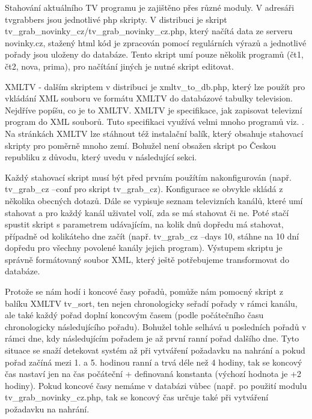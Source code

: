 \vspace{10pt}

Stahování aktuálního TV programu je zajištěno přes různé moduly. V adresáři tvgrabbers jsou jednotlivé php skripty. V distribuci je skript tv\_grab\_novinky\_cz/tv\_grab\_novinky\_cz.php, který načítá data ze serveru novinky.cz, stažený html kód je zpracován pomocí regulárních výrazů a jednotlivé pořady jsou uloženy do databáze. Tento skript umí pouze několik programů (čt1, čt2, nova, prima), pro načítání jiných je nutné skript editovat.

\vspace{10pt}

XMLTV - dalším skriptem v distribuci je xmltv\_to\_db.php, který lze použít pro vkládání XML souboru ve formátu XMLTV do databázové tabulky television. Nejdříve popíšu, co je to XMLTV. XMLTV je specifikace, jak zapisovat televizní program do XML souborů. Tuto specifikaci využívá velmi mnoho programů viz. \cite{xmltvURL}. Na stránkách XMLTV lze stáhnout též instalační balík, který obsahuje stahovací skripty pro poměrně mnoho zemí. Bohužel není obsažen skript po Českou republiku z důvodu, který uvedu v následující sekci.

\vspace{10pt}

Každý stahovací skript musí být před prvním použítím nakonfigurován (např. tv\_grab\_cz --conf pro skript tv\_grab\_cz). Konfigurace se obvykle skládá z několika obecných dotazů. Dále se vypisuje seznam televizních kanálů, které umí stahovat a pro každý kanál uživatel volí, zda se má stahovat či ne. Poté stačí spustit skript s parametrem udávajícím, na kolik dnů dopředu má stahovat, případně od kolikáteho dne začít (např. tv\_grab\_cz --days 10, stáhne na 10 dní dopředu pro všechny povolené kanály jejich program). Výstupem skriptu je správně formátovaný soubor XML, který ještě potřebujeme transformovat do databáze.

\vspace{10pt}

Protože se nám hodí i koncové časy pořadů, pomůže nám pomocný skript z balíku XMLTV tv\_sort, ten nejen chronologicky seřadí pořady v rámci kanálu, ale také každý pořad doplní koncovým časem (podle počátečního času chronologicky následujícího pořadu). Bohužel tohle selhává u posledních pořadů v rámci dne, kdy následujícím pořadem je až první ranní pořad dalšího dne. Tyto situace se snaží detekovat systém až při vytváření požadavku na nahrání a pokud pořad začíná mezi 1. a 5. hodinou ranní a trvá déle než 4 hodiny, tak se koncový čas nastaví jen na čas počáteční + definovaná konstanta (výchozí hodnota je +2 hodiny). Pokud koncové časy nemáme v databázi vůbec (např. po použití modulu tv\_grab\_novinky\_cz.php, tak se koncový čas určuje také při vytváření požadavku na nahrání.

